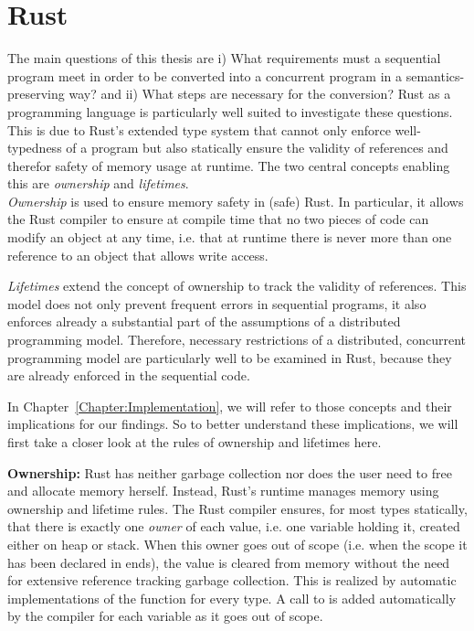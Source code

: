 \section{Rust}
\label{subsec:Rust}
The main questions of this thesis are i) What requirements must a sequential program meet in order to be converted into a concurrent program in a semantics-preserving way? and ii) What steps are necessary for the conversion? Rust as a programming language is particularly well suited to investigate these questions. This is due to Rust's extended type system that cannot only enforce well-typedness of a program but also statically ensure the validity of references and therefor safety of memory usage at runtime. The two central concepts enabling this are \emph{ownership} and \emph{lifetimes}.\\

\emph{Ownership} is used to ensure memory safety in (safe) Rust. In particular, it allows the Rust compiler to ensure at compile time that no two pieces of code can modify an object at any time, i.e. that at runtime there is never more than one reference to an object that allows write access. 

\emph{Lifetimes} extend the concept of ownership to track the validity of references. This model does not only prevent frequent errors in sequential programs, it also enforces already a substantial part of the assumptions of a distributed programming model. Therefore, necessary restrictions of a distributed, concurrent programming model are particularly well to be examined in Rust, because they are already enforced in the sequential code. 

In Chapter~\ref{Chapter:Implementation}, we will refer to those concepts and their implications for our findings. So to better understand these implications, we will first take a closer look at the rules of ownership and lifetimes here.

\textbf{Ownership:}
Rust has neither garbage collection nor does the user need to free and allocate memory herself. Instead, Rust's runtime manages memory using ownership and lifetime rules. The Rust compiler ensures, for most types statically, that there is exactly one \emph{owner} of each value, i.e. one variable holding it, created either on heap or stack. When this owner goes out of scope (i.e. when the scope it has been declared in ends), the value is cleared from memory without the need for extensive reference tracking garbage collection.
This is realized by automatic implementations of the  function for every type. A call to  is added automatically by the compiler for each variable as it goes out of scope.


